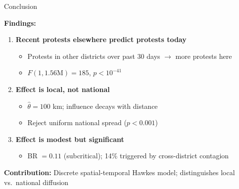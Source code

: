 \documentclass[aspectratio=169]{beamer}
\begin{document}
\begin{frame}{Conclusion}

\textbf{Findings:}

\begin{enumerate}
    \item \textbf{Recent protests elsewhere predict protests today}
    \begin{itemize}
        \item Protests in other districts over past 30 days $\rightarrow$ more protests here
        \item $F(1, 1.56\text{M}) = 185$, $p < 10^{-41}$
    \end{itemize}

    \vspace{0.3em}

    \item \textbf{Effect is local, not national}
    \begin{itemize}
        \item $\hat{\theta} = 100$ km; influence decays with distance
        \item Reject uniform national spread ($p < 0.001$)
    \end{itemize}

    \vspace{0.3em}

    \item \textbf{Effect is modest but significant}
    \begin{itemize}
        \item BR $= 0.11$ (subcritical); 14\% triggered by cross-district contagion
    \end{itemize}
\end{enumerate}

\vspace{0.5em}

\textbf{Contribution:} Discrete spatial-temporal Hawkes model; distinguishes local vs.\ national diffusion

\end{frame}
\end{document}
